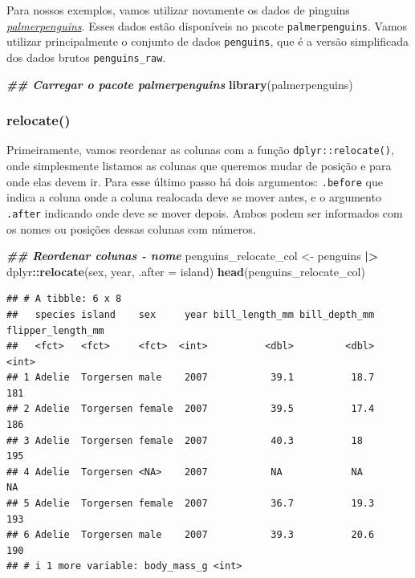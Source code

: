 \documentclass[
]{article}
\newenvironment{Shaded}{\begin{snugshade}}{\end{snugshade}}
\newcommand{\AttributeTok}[1]{\textcolor[rgb]{0.13,0.29,0.53}{#1}}
\newcommand{\DocumentationTok}[1]{\textcolor[rgb]{0.56,0.35,0.01}{\textbf{\textit{#1}}}}
\newcommand{\FunctionTok}[1]{\textcolor[rgb]{0.13,0.29,0.53}{\textbf{#1}}}
\newcommand{\NormalTok}[1]{#1}
\newcommand{\OtherTok}[1]{\textcolor[rgb]{0.56,0.35,0.01}{#1}}
\newcommand{\SpecialCharTok}[1]{\textcolor[rgb]{0.81,0.36,0.00}{\textbf{#1}}}
\begin{document}
Para nossos exemplos, vamos utilizar novamente os dados de pinguins \href{https://allisonhorst.github.io/palmerpenguins}{\emph{palmerpenguins}}. Esses dados estão disponíveis no pacote \texttt{palmerpenguins}. Vamos utilizar principalmente o conjunto de dados \texttt{penguins}, que é a versão simplificada dos dados brutos \texttt{penguins\_raw}.

\begin{Shaded}
\begin{Highlighting}[]
\DocumentationTok{\#\# Carregar o pacote palmerpenguins}
\FunctionTok{library}\NormalTok{(palmerpenguins)}
\end{Highlighting}
\end{Shaded}

\hypertarget{relocate}{%
\subsubsection{relocate()}\label{relocate}}

Primeiramente, vamos reordenar as colunas com a função \texttt{dplyr::relocate()}, onde simplesmente listamos as colunas que queremos mudar de posição e para onde elas devem ir. Para esse último passo há dois argumentos: \texttt{.before} que indica a coluna onde a coluna realocada deve se mover antes, e o argumento \texttt{.after} indicando onde deve se mover depois. Ambos podem ser informados com os nomes ou posições dessas colunas com números.

\begin{Shaded}
\begin{Highlighting}[]
\DocumentationTok{\#\# Reordenar colunas {-} nome}
\NormalTok{penguins\_relocate\_col }\OtherTok{\textless{}{-}}\NormalTok{ penguins }\SpecialCharTok{|\textgreater{}} 
\NormalTok{    dplyr}\SpecialCharTok{::}\FunctionTok{relocate}\NormalTok{(sex, year, }\AttributeTok{.after =}\NormalTok{ island)}
\FunctionTok{head}\NormalTok{(penguins\_relocate\_col)}
\end{Highlighting}
\end{Shaded}

\begin{verbatim}
## # A tibble: 6 x 8
##   species island    sex     year bill_length_mm bill_depth_mm flipper_length_mm
##   <fct>   <fct>     <fct>  <int>          <dbl>         <dbl>             <int>
## 1 Adelie  Torgersen male    2007           39.1          18.7               181
## 2 Adelie  Torgersen female  2007           39.5          17.4               186
## 3 Adelie  Torgersen female  2007           40.3          18                 195
## 4 Adelie  Torgersen <NA>    2007           NA            NA                  NA
## 5 Adelie  Torgersen female  2007           36.7          19.3               193
## 6 Adelie  Torgersen male    2007           39.3          20.6               190
## # i 1 more variable: body_mass_g <int>
\end{verbatim}
\end{document}
